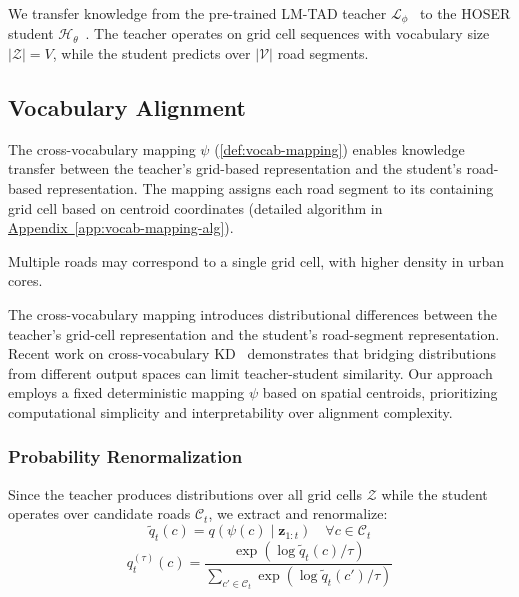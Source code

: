 We transfer knowledge from the pre-trained LM-TAD teacher $\mathcal{L}_\phi$~\cite{mbuyaTrajectoryAnomalyDetection2024} to the HOSER student $\mathcal{H}_\theta$~\cite{caoHolisticSemanticRepresentation2025}. The teacher operates on grid cell sequences with vocabulary size $|\mathcal{Z}| = V$, while the student predicts over $|\mathcal{V}|$ road segments.



\subsection{Vocabulary Alignment}
\label{sec:method-vocab}

The cross-vocabulary mapping $\psi$ (\autoref{def:vocab-mapping}) enables knowledge transfer between the teacher's grid-based representation and the student's road-based representation. The mapping assigns each road segment to its containing grid cell based on centroid coordinates (detailed algorithm in \hyperref[app:vocab-mapping-alg]{Appendix~\ref*{app:vocab-mapping-alg}}).

\begin{remark}
    Multiple roads may correspond to a single grid cell, with higher density in urban cores.
\end{remark}

\begin{remark}
    The cross-vocabulary mapping introduces distributional differences between the teacher's grid-cell representation and the student's road-segment representation. Recent work on cross-vocabulary KD~\cite{zhangDualSpaceFrameworkGeneral2025} demonstrates that bridging distributions from different output spaces can limit teacher-student similarity. Our approach employs a fixed deterministic mapping $\psi$ based on spatial centroids, prioritizing computational simplicity and interpretability over alignment complexity.
\end{remark}

\subsubsection{Probability Renormalization}
\label{sec:method-renorm}

Since the teacher produces distributions over all grid cells $\mathcal{Z}$ while the student operates over candidate roads $\mathcal{C}_t$, we extract and renormalize:
\begin{equation}
    \tilde{q}_t(c) = q(\psi(c) \mid \mathbf{z}_{1:t}) \quad \forall c \in \mathcal{C}_t
    \label{eq:extract}
\end{equation}
\begin{equation}
    q_t^{(\tau)}(c) = \frac{\exp(\log \tilde{q}_t(c) / \tau)}{\sum_{c' \in \mathcal{C}_t} \exp(\log \tilde{q}_t(c') / \tau)}
    \label{eq:renorm}
\end{equation}

